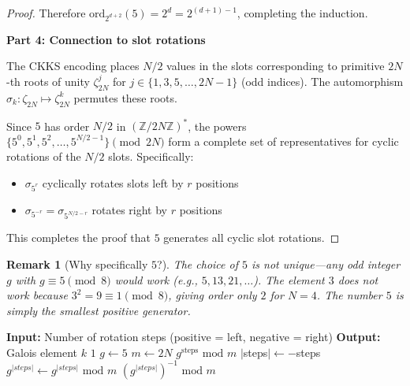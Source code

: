 \documentclass[11pt,a4paper]{article}
\newtheorem{remark}{Remark}
\newcommand{\Z}{\mathbb{Z}}
\newcommand{\bmod}{\text{ mod }}
\begin{document}
\begin{proof}
Therefore $\text{ord}_{2^{d+2}}(5) = 2^d = 2^{(d+1)-1}$, completing the induction.

\textbf{Part 4: Connection to slot rotations}

The CKKS encoding places $N/2$ values in the slots corresponding to primitive $2N$-th roots of unity $\zeta_{2N}^j$ for $j \in \{1, 3, 5, \ldots, 2N-1\}$ (odd indices). The automorphism $\sigma_k: \zeta_{2N} \mapsto \zeta_{2N}^k$ permutes these roots.

Since $5$ has order $N/2$ in $(\Z/2N\Z)^*$, the powers $\{5^0, 5^1, 5^2, \ldots, 5^{N/2-1}\} \pmod{2N}$ form a complete set of representatives for cyclic rotations of the $N/2$ slots. Specifically:
\begin{itemize}
    \item $\sigma_{5^r}$ cyclically rotates slots left by $r$ positions
    \item $\sigma_{5^{-r}} = \sigma_{5^{N/2-r}}$ rotates right by $r$ positions
\end{itemize}

This completes the proof that $5$ generates all cyclic slot rotations.
\end{proof}

\begin{remark}[Why specifically $5$?]
The choice of $5$ is not unique---any odd integer $g$ with $g \equiv 5 \pmod 8$ would work (e.g., $5, 13, 21, \ldots$). The element $3$ does \emph{not} work because $3^2 = 9 \equiv 1 \pmod 8$, giving order only $2$ for $N = 4$. The number $5$ is simply the smallest positive generator.
\end{remark}

\begin{algorithm}[H]
\caption{Compute Galois Element for Rotation}
\begin{algorithmic}[1]
    \State \textbf{Input:} Number of rotation steps (positive = left, negative = right)
    \State \textbf{Output:} Galois element $k$
    \State
        \State \Return $1$ 
    \EndIf
    \State
    \State $g \gets 5$ 
    \State $m \gets 2N$
    \State
        \State \Return $g^{\text{steps}} \bmod m$
    \Else
        \State $|$steps$| \gets -$steps
        \State $g^{|steps|} \gets g^{|steps|} \bmod m$
        \State \Return $(g^{|steps|})^{-1} \bmod m$ 
    \EndIf
\EndFunction
\end{algorithmic}
\end{algorithm}
\end{document}
